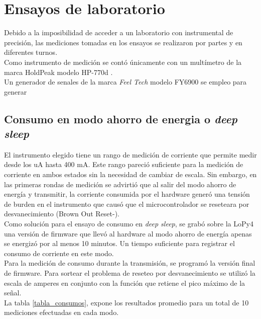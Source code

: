 \section{Ensayos de laboratorio}
Debido a la imposibilidad de acceder a un laboratorio con instrumental de precisión, las mediciones tomadas en los ensayos se realizaron por partes y en diferentes turnos.\\
Como instrumento de medición se contó únicamente con un multímetro de la marca HoldPeak modelo HP-770d \citep{hp770d}.\\
Un generador de senales de la marca \textit{Feel Tech} modelo FY6900 se empleo para generar
\subsection{Consumo en modo ahorro de energia o \textit{deep sleep}}
El instrumento elegido tiene un rango de medición de corriente que permite medir desde los uA hasta 400 mA. Este rango pareció suficiente para la medición de corriente en ambos estados sin la necesidad de cambiar de escala. Sin embargo, en las primeras rondas de medición se advirtió que al salir del modo ahorro de energía y transmitir, la corriente consumida por el hardware generó una tensión de burden en el instrumento que causó que el microcontrolador se reseteara por desvanecimiento (Brown Out Reset-).\\
Como solución para el ensayo de consumo en \textit{deep sleep}, se grabó sobre la LoPy4 una versión de firmware que llevó al hardware al modo ahorro de energía apenas se energizó por al menos 10 minutos. Un tiempo suficiente para registrar el consumo de corriente en este modo.\\
Para la medición de consumo durante la transmisión, se programó la versión final de firmware. Para sortear el problema de reseteo por desvanecimiento se utilizó la escala de amperes en conjunto con la función que retiene el pico máximo de la señal.\\
La tabla \ref{tabla_consumos}, expone los resultados promedio para un total de 10 mediciones efectuadas en cada modo.\\
